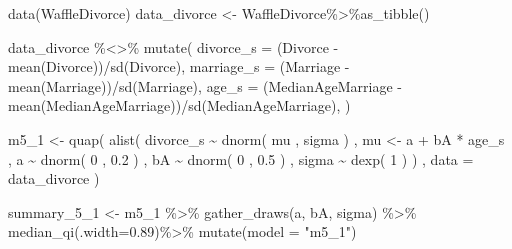 \documentclass[
]{book}
\newenvironment{Shaded}{\begin{snugshade}}{\end{snugshade}}
\newcommand{\AttributeTok}[1]{\textcolor[rgb]{0.77,0.63,0.00}{#1}}
\newcommand{\DecValTok}[1]{\textcolor[rgb]{0.00,0.00,0.81}{#1}}
\newcommand{\FloatTok}[1]{\textcolor[rgb]{0.00,0.00,0.81}{#1}}
\newcommand{\FunctionTok}[1]{\textcolor[rgb]{0.00,0.00,0.00}{#1}}
\newcommand{\NormalTok}[1]{#1}
\newcommand{\OtherTok}[1]{\textcolor[rgb]{0.56,0.35,0.01}{#1}}
\newcommand{\SpecialCharTok}[1]{\textcolor[rgb]{0.00,0.00,0.00}{#1}}
\newcommand{\StringTok}[1]{\textcolor[rgb]{0.31,0.60,0.02}{#1}}
\begin{document}
\begin{Shaded}
\begin{Highlighting}[]
\FunctionTok{data}\NormalTok{(WaffleDivorce) }
\NormalTok{data\_divorce }\OtherTok{\textless{}{-}}\NormalTok{ WaffleDivorce}\SpecialCharTok{\%\textgreater{}\%}\FunctionTok{as\_tibble}\NormalTok{()}

\NormalTok{data\_divorce }\SpecialCharTok{\%\textless{}\textgreater{}\%} \FunctionTok{mutate}\NormalTok{(}
  \AttributeTok{divorce\_s =}\NormalTok{ (Divorce }\SpecialCharTok{{-}} \FunctionTok{mean}\NormalTok{(Divorce))}\SpecialCharTok{/}\FunctionTok{sd}\NormalTok{(Divorce),}
  \AttributeTok{marriage\_s =}\NormalTok{ (Marriage }\SpecialCharTok{{-}} \FunctionTok{mean}\NormalTok{(Marriage))}\SpecialCharTok{/}\FunctionTok{sd}\NormalTok{(Marriage),}
  \AttributeTok{age\_s =}\NormalTok{ (MedianAgeMarriage }\SpecialCharTok{{-}} \FunctionTok{mean}\NormalTok{(MedianAgeMarriage))}\SpecialCharTok{/}\FunctionTok{sd}\NormalTok{(MedianAgeMarriage),}
\NormalTok{)}

\NormalTok{m5\_1 }\OtherTok{\textless{}{-}} \FunctionTok{quap}\NormalTok{( }
  \FunctionTok{alist}\NormalTok{( }
\NormalTok{    divorce\_s }\SpecialCharTok{\textasciitilde{}} \FunctionTok{dnorm}\NormalTok{( mu , sigma ) , }
\NormalTok{    mu }\OtherTok{\textless{}{-}}\NormalTok{ a }\SpecialCharTok{+}\NormalTok{ bA }\SpecialCharTok{*}\NormalTok{ age\_s , }
\NormalTok{    a }\SpecialCharTok{\textasciitilde{}} \FunctionTok{dnorm}\NormalTok{( }\DecValTok{0}\NormalTok{ , }\FloatTok{0.2}\NormalTok{ ) , }
\NormalTok{    bA }\SpecialCharTok{\textasciitilde{}} \FunctionTok{dnorm}\NormalTok{( }\DecValTok{0}\NormalTok{ , }\FloatTok{0.5}\NormalTok{ ) , }
\NormalTok{    sigma }\SpecialCharTok{\textasciitilde{}} \FunctionTok{dexp}\NormalTok{( }\DecValTok{1}\NormalTok{ )}
\NormalTok{) , }\AttributeTok{data =}\NormalTok{ data\_divorce )}

\NormalTok{summary\_5\_1 }\OtherTok{\textless{}{-}}\NormalTok{ m5\_1 }\SpecialCharTok{\%\textgreater{}\%}
  \FunctionTok{gather\_draws}\NormalTok{(a, bA, sigma) }\SpecialCharTok{\%\textgreater{}\%}
  \FunctionTok{median\_qi}\NormalTok{(}\AttributeTok{.width=}\FloatTok{0.89}\NormalTok{)}\SpecialCharTok{\%\textgreater{}\%}
  \FunctionTok{mutate}\NormalTok{(}\AttributeTok{model =} \StringTok{"m5\_1"}\NormalTok{)}


\end{Highlighting}
\end{Shaded}
\end{document}
